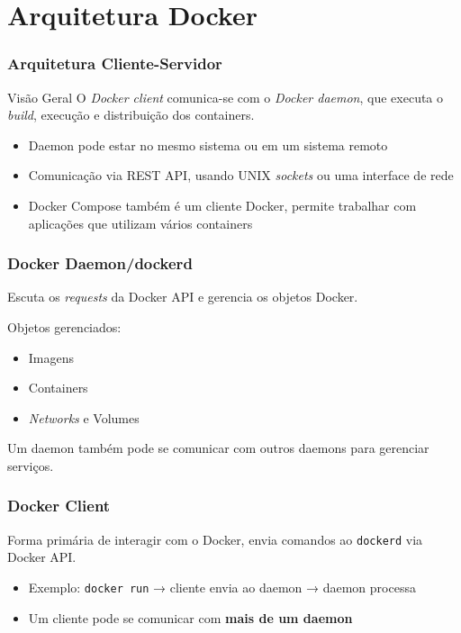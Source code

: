 \section{Arquitetura Docker}

\begin{frame}
  \frametitle{Arquitetura Cliente-Servidor}
  \begin{block}{Visão Geral}
    O \textit{Docker client} comunica-se com o \textit{Docker daemon}, que executa o \textit{build}, execução e distribuição dos containers.
  \end{block}

  \vspace{0.5em}
  \begin{itemize}
    \item<2-> Daemon pode estar no mesmo sistema ou em um sistema remoto
    \item<3-> Comunicação via REST API, usando UNIX \textit{sockets} ou uma interface de rede
    \item<4-> Docker Compose também é um cliente Docker, permite trabalhar com aplicações que utilizam vários containers
  \end{itemize}
\end{frame}


\begin{frame}
  \frametitle{Docker Daemon/dockerd}
  Escuta os \textit{requests} da Docker API e gerencia os objetos Docker.

  \vspace{0.5em}
  Objetos gerenciados:
  \begin{itemize}
    \item Imagens
    \item Containers
    \item \textit{Networks} e Volumes
  \end{itemize}

  \vspace{0.5em}
  Um daemon também pode se comunicar com outros daemons para gerenciar serviços.
\end{frame}


\begin{frame}
  \frametitle{Docker Client}
    Forma primária de interagir com o Docker, envia comandos ao \texttt{dockerd} via Docker API.

  \vspace{0.5em}
  \begin{itemize}
    \item Exemplo: \texttt{docker run} → cliente envia ao daemon → daemon processa
    \item Um cliente pode se comunicar com \textbf{mais de um daemon}
  \end{itemize}
\end{frame}


